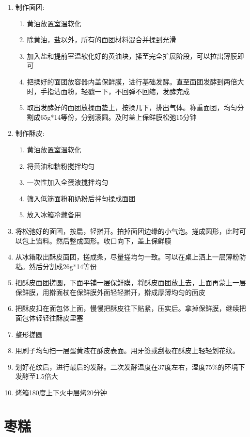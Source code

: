 \begin{enumerate}
    \item 制作面团:
    \begin{enumerate}
    \item 黄油放置室温软化
    \item 除黄油，盐以外，所有的面团材料混合并揉到光滑
    \item 加入盐和提前室温软化好的黄油块，揉至完全扩展阶段，可以拉出薄膜即可
    \item 把揉好的面团放容器内盖保鲜膜，进行基础发酵。直至面团发酵到两倍大时，手指沾面粉，轻戳一下，不回弹不回缩，发酵完成
    \item 取出发酵好的面团放揉面垫上，按揉几下，排出气体。称重面团，均匀分割成65g*14等份，分别滚圆。及时盖上保鲜膜松弛15分钟
    \end{enumerate}
    \item 制作酥皮:
    \begin{enumerate}
    \item 黄油放置室温软化
    \item 将黄油和糖粉搅拌均匀
    \item 一次性加入全蛋液搅拌均匀
    \item 筛入低筋面粉和奶粉后拌匀揉成面团
    \item 放入冰箱冷藏备用
    \end{enumerate}
    \item 将松弛好的面团，按扁，轻擀开。拍掉面团边缘的小气泡。搓成圆形，此时可以包上馅料。然后整成圆形。收口向下，盖上保鲜膜
    \item 从冰箱取出酥皮面团，搓成条，尽量搓均匀一致。可以在桌上洒上一层薄粉防粘。然后分割成26g*14等份
    \item 把酥皮面团搓圆，下面平铺一层保鲜膜，将酥皮面团放上去，上面再蒙上一层保鲜膜，用擀面杖在保鲜膜外面轻轻擀开，擀成厚薄均匀的面皮
    \item 把酥皮扣在面包体上面，慢慢把酥皮往下贴紧，压实后。拿掉保鲜膜，继续把面包体轻轻往酥皮里塞
    \item 整形搓圆
    \item 用刷子均匀扫一层蛋黄液在酥皮表面。用牙签或刮板在酥皮上轻轻划花纹。
    \item 划好花纹后，进行最后的发酵。二次发酵温度在37度左右，湿度75\%的环境下发酵至1.5倍大
    \item 烤箱180度上下火中层烤20分钟
\end{enumerate}


\section{枣糕}

